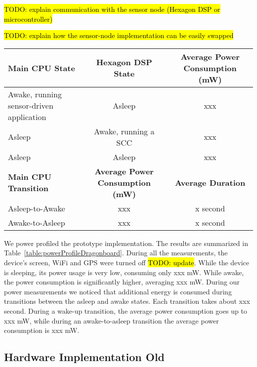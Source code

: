 \hl{TODO: explain communication with the sensor node (Hexagon DSP or microcontroller)}

\hl{TODO: explain how the sensor-node implementation can be easily swapped}

\bgroup
\def\arraystretch{1.5}
\begin{table*}[t]
\centering
{\small
	\begin{tabular}{| l | c | c |}
		\hline
		\textbf{Main CPU State}						& \textbf{Hexagon DSP State}	& \textbf{Average Power Consumption (mW)} 	\\ \hline
		Awake, running sensor-driven application  	& Asleep						& xxx 										\\ \hline
		Asleep										& Awake, running a SCC			& xxx 										\\ \hline
		Asleep 										& Asleep						& xxx 										\\ \hline \hline
		
		\textbf{Main CPU Transition}				& \textbf{Average Power Consumption (mW)} 		& \textbf{Average Duration} \\ \hline
		Asleep-to-Awake 							& xxx 											& x second \\ \hline
		Awake-to-Asleep 							& xxx 											& x second \\ \hline
	\end{tabular}
}
	\caption{DragonBoard 8094 Development Kit Power Profile}
	\label{table:powerProfileDragonboard}
\end{table*}
\egroup

We power profiled the prototype implementation.  The results are summarized in
Table~\ref{table:powerProfileDragonboard}.  During all the measurements, the
device's screen, WiFi and GPS were turned off \hl{TODO: update}.  While the device is
sleeping, its power usage is very low, consuming only xxx mW.  While
awake, the power consumption is significantly higher, averaging xxx
mW.  During our power measurements we noticed that additional energy is
consumed during transitions between the asleep and awake states.  Each
transition takes about xxx second.  During a wake-up transition, the
average power consumption goes up to xxx mW, while during an
awake-to-asleep transition the average power consumption is xxx mW.

\iffalse
\subsection{Hardware Implementation Old}

